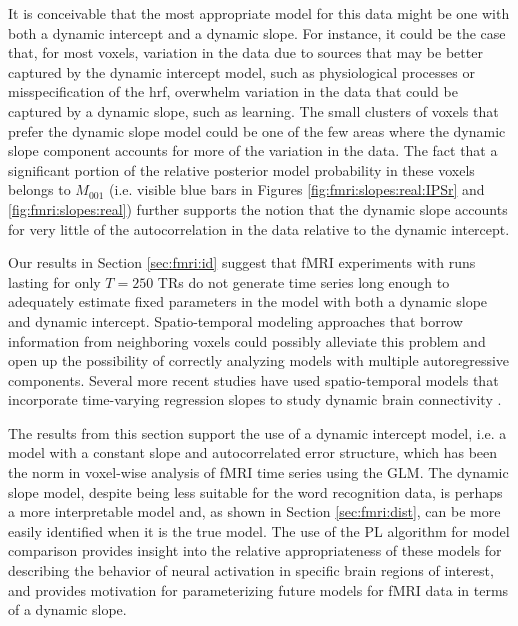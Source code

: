 It is conceivable that the most appropriate model for this data might be one with both a dynamic intercept and a dynamic slope. For instance, it could be the case that, for most voxels, variation in the data due to sources that may be better captured by the dynamic intercept model, such as physiological processes or misspecification of the hrf, overwhelm variation in the data that could be captured by a dynamic slope, such as learning. The small clusters of voxels that prefer the dynamic slope model could be one of the few areas where the dynamic slope component accounts for more of the variation in the data. The fact that a significant portion of the relative posterior model probability in these voxels belongs to $M_{001}$ (i.e. visible blue bars in Figures \ref{fig:fmri:slopes:real:IPSr} and \ref{fig:fmri:slopes:real}) further supports the notion that the dynamic slope accounts for very little of the autocorrelation in the data relative to the dynamic intercept.

Our results in Section \ref{sec:fmri:id} suggest that fMRI experiments with runs lasting for only $T = 250$ TRs do not generate time series long enough to adequately estimate fixed parameters in the model with both a dynamic slope and dynamic intercept. Spatio-temporal modeling approaches that borrow information from neighboring voxels could possibly alleviate this problem and open up the possibility of correctly analyzing models with multiple autoregressive components. Several more recent studies have used spatio-temporal models that incorporate time-varying regression slopes to study dynamic brain connectivity \citep{ho:ombao:2005:statespace,bhatt:matira:aoas:2011}.

The results from this section support the use of a dynamic intercept model, i.e. a model with a constant slope and autocorrelated error structure, which has been the norm in voxel-wise analysis of fMRI time series using the GLM. The dynamic slope model, despite being less suitable for the word recognition data, is perhaps a more interpretable model and, as shown in Section \ref{sec:fmri:dist}, can be more easily identified when it is the true model. The use of the PL algorithm for model comparison provides insight into the relative appropriateness of these models for describing the behavior of neural activation in specific brain regions of interest, and provides motivation for parameterizing future models for fMRI data in terms of a dynamic slope. 